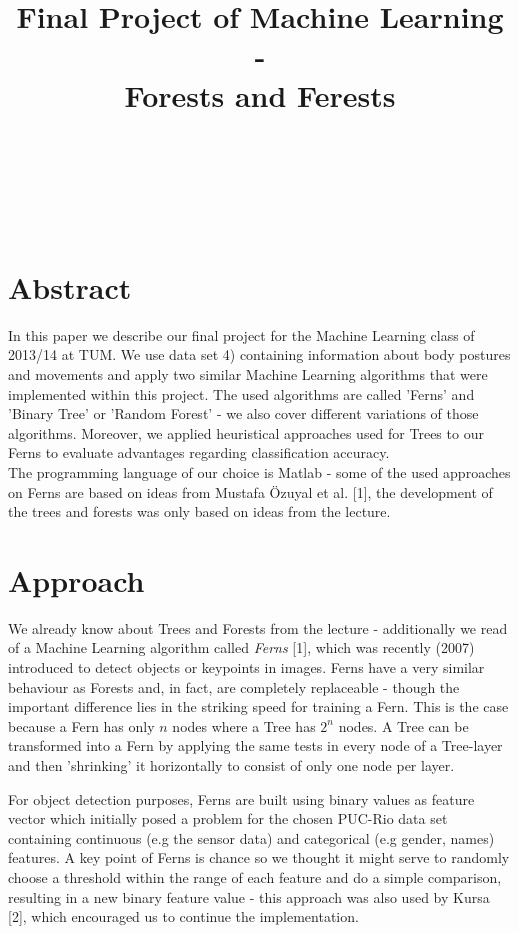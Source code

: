\documentclass[twocolumn]{article}
\title{Final Project of Machine Learning\\-\\Forests and Ferests}
\author{
\name{Jonas Uhrig}\\
\imat{03616049}\\
\email{jonas.uhrig@in.tum.de}
\And
\name{Michael Wolfram} \\
\imat{03616011}\\
\email{michaelwolfram@gmx.de}
}
\begin{document}
\onecolumn
\maketitle

\section*{Abstract}

In this paper we describe our final project for the Machine Learning class of 2013/14 at TUM. We use data set 4) containing information about body postures and movements and apply two similar Machine Learning algorithms that were implemented within this project. The used algorithms are called 'Ferns' and 'Binary Tree' or 'Random Forest' - we also cover different variations of those algorithms. Moreover, we applied heuristical approaches used for Trees to our Ferns to evaluate advantages regarding classification accuracy.\\
The programming language of our choice is Matlab - some of the used approaches on Ferns are based on ideas from Mustafa \"Ozuyal et al. [1], the development of the trees and forests was only based on ideas from the lecture.



\twocolumn

\section{Approach}
We already know about Trees and Forests from the lecture - additionally we read of a Machine Learning algorithm called \textit{Ferns} [1], which was recently (2007) introduced to detect objects or keypoints in images. Ferns have a very similar behaviour as Forests and, in fact, are completely replaceable - though the important difference lies in the striking speed for training a Fern. This is the case because a Fern has only $n$ nodes where a Tree has $2^n$ nodes. A Tree can be transformed into a Fern by applying the same tests in every node of a Tree-layer and then 'shrinking' it horizontally to consist of only one node per layer.

For object detection purposes, Ferns are built using binary values as feature vector which initially posed a problem for the chosen PUC-Rio data set containing continuous (e.g the sensor data) and categorical (e.g gender, names) features. A key point of Ferns is chance so we thought it might serve to randomly choose a threshold within the range of each feature and do a simple comparison, resulting in a new binary feature value - this approach was also used by Kursa [2], which encouraged us to continue the implementation.
\end{document}
